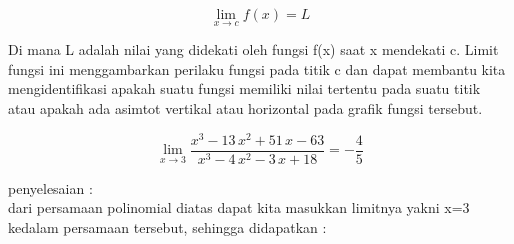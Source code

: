\documentclass[a4paper,10pt]{article}
\begin{document}
\begin{eulernotebook}
\begin{eulercomment}
\begin{eulercomment}
\begin{eulercomment}
\begin{eulercomment}
\begin{eulercomment}
\begin{eulercomment}
\end{eulercomment}
\begin{eulerformula}
\[
\lim_{x \to c} f(x) = L
\]
\end{eulerformula}
\begin{eulercomment}
Di mana L adalah nilai yang didekati oleh fungsi f(x) saat x mendekati
c. Limit fungsi ini menggambarkan perilaku fungsi pada titik c dan
dapat membantu kita mengidentifikasi apakah suatu fungsi memiliki
nilai tertentu pada suatu titik atau apakah ada asimtot vertikal atau
horizontal pada grafik fungsi tersebut.
\end{eulercomment}
\begin{eulerformula}
\[
\lim_{x\rightarrow 3}{\frac{x^3-13\,x^2+51\,x-63}{x^3-4\,x^2-3\,x+
 18}}=-\frac{4}{5}
\]
\end{eulerformula}
\begin{eulercomment}
penyelesaian :\\
dari persamaan polinomial diatas dapat kita masukkan limitnya yakni
x=3 kedalam persamaan tersebut, sehingga didapatkan :


\end{eulercomment}
\end{eulercomment}
\end{eulercomment}
\end{eulercomment}
\end{eulercomment}
\end{eulercomment}
\end{eulernotebook}
\end{document}
